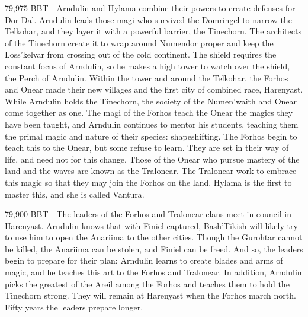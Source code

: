 \documentclass[smalldemyvopaper,11pt,twoside,onecolumn,openright,extrafontsizes]{memoir}
\begin{document}
79,975 BBT—Arndulin and Hylama combine their powers to create defenses for Dor Dal. Arndulin leads those magi who survived the Domringel to narrow the Telkohar, and they layer it with a powerful barrier, the Tinechorn. The architects of the Tinechorn create it to wrap around Numendor proper and keep the Loss’kelvar from crossing out of the cold continent. The shield requires the constant focus of Arndulin, so he makes a high tower to watch over the shield, the Perch of Arndulin. Within the tower and around the Telkohar, the Forhos and Onear made their new villages and the first city of combined race, Harenyast. While Arndulin holds the Tinechorn, the society of the Numen’waith and Onear come together as one. The magi of the Forhos teach the Onear the magics they have been taught, and Arndulin continues to mentor his students, teaching them the primal magic and nature of their species: shapeshifting. The Forhos begin to teach this to the Onear, but some refuse to learn. They are set in their way of life, and need not for this change. Those of the Onear who pursue mastery of the land and the waves are known as the Tralonear. The Tralonear work to embrace this magic so that they may join the Forhos on the land. Hylama is the first to master this, and she is called Vantura.

79,900 BBT—The leaders of the Forhos and Tralonear clans meet in council in Harenyast. Arndulin knows that with Finiel captured, Bash’Tikish will likely try to use him to open the Anariima to the other cities. Though the Gurohtar cannot be killed, the Anariima can be stolen, and Finiel can be freed. And so, the leaders begin to prepare for their plan: Arndulin learns to create blades and arms of magic, and he teaches this art to the Forhos and Tralonear. In addition, Arndulin picks the greatest of the Areil among the Forhos and teaches them to hold the Tinechorn strong. They will remain at Harenyast when the Forhos march north. Fifty years the leaders prepare longer.
\end{document}
